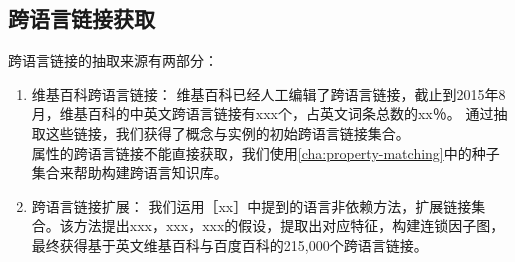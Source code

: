 %
%
%
%
%

\subsection{跨语言链接获取}
\label{sec5:cross-lingual}

跨语言链接的抽取来源有两部分：
\begin{enumerate}[1.]
\item {\heiti 维基百科跨语言链接：} 维基百科已经人工编辑了跨语言链接，截止到2015年8月，维基百科的中英文跨语言链接有xxx个，占英文词条总数的xx％。 通过抽取这些链接，我们获得了概念与实例的初始跨语言链接集合。 \\
属性的跨语言链接不能直接获取，我们使用\ref{cha:property-matching}中的种子集合来帮助构建跨语言知识库。

\item {\heiti 跨语言链接扩展：} 我们运用［xx］中提到的语言非依赖方法，扩展链接集合。该方法提出xxx，xxx，xxx的假设，提取出对应特征，构建连锁因子图，最终获得基于英文维基百科与百度百科的215,000个跨语言链接。
\end{enumerate}


